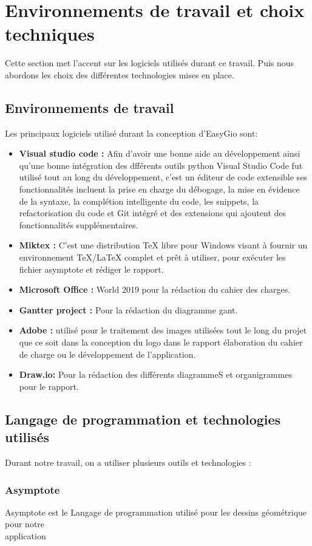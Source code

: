 \documentclass[a4paper]{report}
\begin{document}
\section{Environnements de travail et choix techniques}
Cette section met l’accent sur les logiciels utilisés durant ce travail. Puis nous abordons les choix des différentes technologies mises en place.
\subsection{Environnements de travail}
Les principaux logiciels utilisé durant la conception d'EasyGio sont:
\begin{itemize}
    \item \textbf{Visual studio code :} Afin d’avoir une bonne aide au développement ainsi qu’une bonne intégration des dfférents outils python Visual Studio Code fut utilisé tout au long du développement, c'est un éditeur de code extensible ses fonctionnalités incluent la prise en charge du débogage, la mise en évidence de la syntaxe, la complétion intelligente du code, les snippets, la refactorisation du code et Git intégré et des extensions qui ajoutent des  fonctionnalités supplémentaires.
    \item  \textbf{Miktex :} C'est une distribution TeX libre pour Windows visant à fournir un environnement TeX/LaTeX complet et prêt à utiliser, pour exécuter les fichier asymptote et rédiger le rapport.
    \item  \textbf{Microsoft Office :} World 2019 pour la rédaction du cahier des charges.
    \item  \textbf{Gantter project :} Pour la rédaction du diagramme gant.
    \item  \textbf{Adobe :} utilisé pour le traitement des images utilisées tout le long du projet que ce soit dans la conception du logo dans le rapport élaboration du cahier de charge ou le développement de l’application.
    \item  \textbf{Draw.io:} Pour la rédaction des différents diagrammeS et organigrammes pour le rapport.
\end{itemize}
\subsection{Langage de programmation et technologies utilisés}
Durant notre travail, on a utiliser plusieurs outils et technologies :
\subsubsection{Asymptote}
Asymptote est le Langage de programmation utilisé pour les dessins géométrique pour notre \\application 
\end{document}
